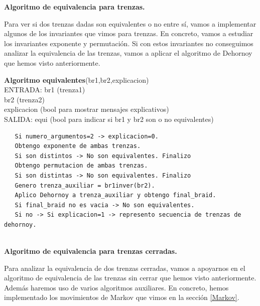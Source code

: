 \bigskip
\begin{center}
	\textbf{Algoritmo de equivalencia para trenzas.}
\end{center} 
Para ver si dos trenzas dadas son equivalentes o no entre sí, vamos a implementar algunos de los invariantes que vimos para trenzas. En concreto, vamos a estudiar los invariantes exponente y permutación. Si con estos invariantes no conseguimos analizar la equivalencia de las trenzas, vamos a aplicar el algoritmo de Dehornoy que hemos visto anteriormente. \\

\begin{alg}
	\textbf{Algoritmo equivalentes}(br1,br2,explicacion)\\
	ENTRADA: br1 (trenza1)\\
	\hspace*{2.2cm} br2 (trenza2)\\
	\hspace*{2.2cm} explicacion (bool para mostrar mensajes explicativos)\\
	SALIDA: \hspace{0.4cm} equi (bool para indicar si br1 y br2 son o no equivalentes)
	
\begin{lstlisting}
   Si numero_argumentos=2 -> explicacion=0.
   Obtengo exponente de ambas trenzas.
   Si son distintos -> No son equivalentes. Finalizo
   Obtengo permutacion de ambas trenzas.
   Si son distintas -> No son equivalentes. Finalizo
   Genero trenza_auxiliar = br1inver(br2).
   Aplico Dehornoy a trenza_auxiliar y obtengo final_braid.
   Si final_braid no es vacia -> No son equivalentes. 
   Si no -> Si explicacion=1 -> represento secuencia de trenzas de dehornoy.
    
\end{lstlisting}
\end{alg}

\bigskip
\begin{center}
	\textbf{Algoritmo de equivalencia para trenzas cerradas.}
\end{center} 
Para analizar la equivalencia de dos trenzas cerradas, vamos a apoyarnos en el algoritmo de equivalencia de las trenzas sin cerrar que hemos visto anteriormente. Además haremos uso de varios algoritmos auxiliares. En concreto, hemos implementado los movimientos de Markov que vimos en la sección \ref{Markov}.\\

